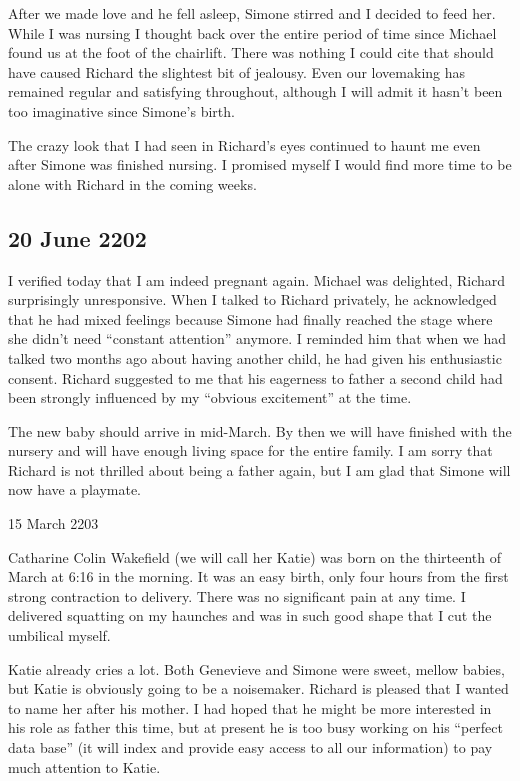\documentclass[]{article}
\begin{document}
After we made love and he fell asleep, Simone stirred and I decided to feed her.  While I was nursing I thought back over the entire period of time since Michael found us at the foot of the chairlift.  There was nothing I could cite that should have caused Richard the slightest bit of jealousy.  Even our lovemaking has remained regular and satisfying throughout, although I will admit it hasn’t been too imaginative since Simone’s birth.

The crazy look that I had seen in Richard’s eyes continued to haunt me even after Simone was finished nursing.  I promised myself I would find more time to be alone with Richard in the coming weeks.

\subsection*{20 June 2202}

I verified today that I am indeed pregnant again.  Michael was delighted, Richard surprisingly unresponsive.  When I talked to Richard privately, he acknowledged that he had mixed feelings because Simone had finally reached the stage where she didn’t need “constant attention” anymore.  I reminded him that when we had talked two months ago about having another child, he had given his enthusiastic consent.  Richard suggested to me that his eagerness to father a second child had been strongly influenced by my “obvious excitement” at the time.

The new baby should arrive in mid-March.  By then we will have finished with the nursery and will have enough living space for the entire family.  I am sorry that Richard is not thrilled about being a father again, but I am glad that Simone will now have a playmate.

15 March 2203

Catharine Colin Wakefield (we will call her Katie) was born on the thirteenth of March at 6:16 in the morning.  It was an easy birth, only four hours from the first strong contraction to delivery.  There was no significant pain at any time.  I delivered squatting on my haunches and was in such good shape that I cut the umbilical myself.

Katie already cries a lot.  Both Genevieve and Simone were sweet, mellow babies, but Katie is obviously going to be a noisemaker.  Richard is pleased that I wanted to name her after his mother.  I had hoped that he might be more interested in his role as father this time, but at present he is too busy working on his “perfect data base” (it will index and provide easy access to all our information) to pay much attention to Katie.
\end{document}
